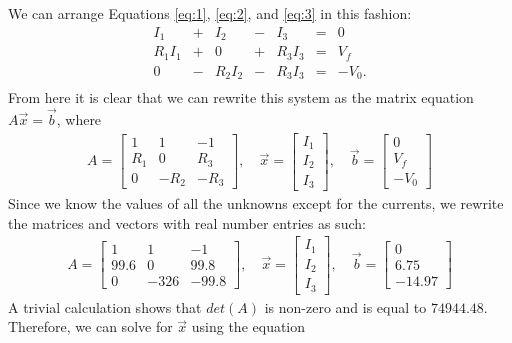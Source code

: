 \documentclass{article}
\begin{document}
We can arrange Equations \ref{eq:1}, \ref{eq:2}, and \ref{eq:3} in this fashion:
\begin{equation*}
    \begin{array}{lclclclcl}
        I_1 & + & I_2 & - & I_3 & = & 0\\
        R_1 I_1 & + & 0 & + &R_3 I_3& = & V_f\\
        0 & - & R_2 I_2 & - & R_3 I_3 & = & -V_0.\\
    \end{array}
\end{equation*}
From here it is clear that we can rewrite this system as the matrix equation $A\vec{x} = \vec{b}$, where 
\[
\begin{gathered}
A = \begin{bmatrix}
    1 & 1 & -1 \\
    R_1 & 0 & R_3\\
    0 & -R_2 & -R_3
\end{bmatrix}, \quad
\vec{x} = \begin{bmatrix}
    I_1\\
    I_2\\
    I_3
\end{bmatrix}, \quad
\vec{b} = \begin{bmatrix}
    0\\
    V_f\\
    -V_0
\end{bmatrix}
\end{gathered}
\]
Since we know the values of all the unknowns except for the currents, we rewrite the matrices and vectors with real number entries as such:
\[
\begin{gathered}
A = \begin{bmatrix}
    1 & 1 & -1 \\
    99.6 & 0 & 99.8\\
    0 & -326 & -99.8
\end{bmatrix}, \quad
\vec{x} = \begin{bmatrix}
    I_1\\
    I_2\\
    I_3
\end{bmatrix}, \quad
\vec{b} = \begin{bmatrix}
    0\\
    6.75\\
    -14.97
\end{bmatrix}
\end{gathered}
\]
A trivial calculation shows that $det(A)$ is non-zero and is equal to $74944.48$.
Therefore, we can solve for $\vec{x}$ using the equation
\end{document}
